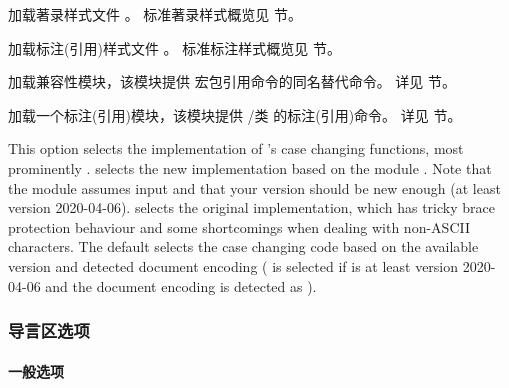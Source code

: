 \begin{optionlist}
加载著录样式文件 。
标准著录样式概览见  节。



加载标注(引用)样式文件 。
标准标注样式概览见  节。



加载兼容性模块，该模块提供  宏包引用命令的同名替代命令。
详见  节。



加载一个标注(引用)模块，该模块提供 \slash 类  的标注(引用)命令。
详见  节。

This option selects the implementation of \biblatex's case changing functions, most prominently .  selects the new implementation based on the  module . Note that the  module assumes \utf input and that your  version should be new enough (at least version 2020-04-06).  selects the original implementation, which has tricky brace protection behaviour and some shortcomings when dealing with non-ASCII characters. The default  selects the case changing code based on the available  version and detected document encoding ( is selected if  is at least version 2020-04-06 and the document encoding is detected as \utf).

\end{optionlist}

\subsubsection{导言区选项}%
\label{use:opt:pre}

\paragraph{一般选项}%
\label{use:opt:pre:gen}

